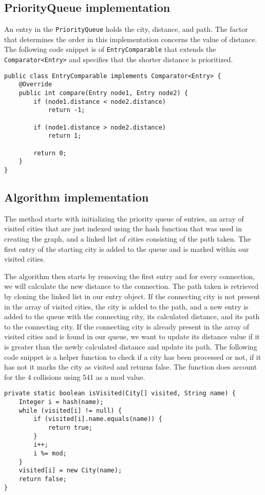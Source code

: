 \documentclass[a4paper,11pt]{article}
\begin{document}
    \subsection*{PriorityQueue implementation}

        An entry in the \texttt{PriorityQueue} holds the city, distance, and path. The factor that determines the order in this implementation concerns the value of distance. The following code snippet is of \texttt{EntryComparable} that extends the \texttt{Comparator<Entry>} and specifies that the shorter distance is prioritized.
\begin{verbatim}
public class EntryComparable implements Comparator<Entry> {
    @Override
    public int compare(Entry node1, Entry node2) {
        if (node1.distance < node2.distance)
            return -1;

        if (node1.distance > node2.distance)
            return 1;

        return 0;
    }
}    
\end{verbatim}
        
    \subsection*{Algorithm implementation}

        The method starts with initializing the priority queue of entries, an array of visited cities that are just indexed using the hash function that was used in creating the graph, and a linked list of cities consisting of the path taken. The first entry of the starting city is added to the queue and is marked within our visited cities.

        The algorithm then starts by removing the first entry and for every connection, we will calculate the new distance to the connection. The path taken is retrieved by cloning the linked list in our entry object. If the connecting city is not present in the array of visited cities, the city is added to the path, and a new entry is added to the queue with the connecting city, its calculated distance, and its path to the connecting city. If the connecting city is already present in the array of visited cities and is found in our queue, we want to update its distance value if it is greater than the newly calculated distance and update its path. The following code snippet is a helper function to check if a city has been processed or not, if it has not it marks the city as visited and returns false. The function does account for the 4 collisions using 541 as a mod value.
\begin{verbatim}
private static boolean isVisited(City[] visited, String name) {
    Integer i = hash(name);
    while (visited[i] != null) {
        if (visited[i].name.equals(name)) {
            return true;
        }
        i++;
        i %= mod;
    }
    visited[i] = new City(name);
    return false;
}
\end{verbatim}
\end{document}
